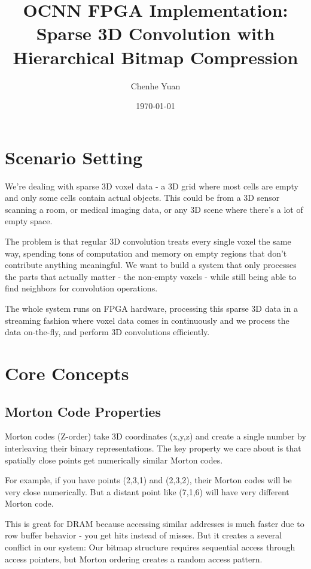 \documentclass[12pt]{article}
\title{OCNN FPGA Implementation: Sparse 3D Convolution with Hierarchical Bitmap Compression}
\author{Chenhe Yuan}
\date{\today}
\begin{document}
\maketitle

\section{Scenario Setting}

We're dealing with sparse 3D voxel data - a 3D grid where most cells are empty and only some cells contain actual objects. This could be from a 3D sensor scanning a room, or medical imaging data, or any 3D scene where there's a lot of empty space.

The problem is that regular 3D convolution treats every single voxel the same way, spending tons of computation and memory on empty regions that don't contribute anything meaningful. We want to build a system that only processes the parts that actually matter - the non-empty voxels - while still being able to find neighbors for convolution operations.

The whole system runs on FPGA hardware, processing this sparse 3D data in a streaming fashion where voxel data comes in continuously and we process the data on-the-fly, and perform 3D convolutions efficiently.

\section{Core Concepts}

\subsection{Morton Code Properties}
Morton codes (Z-order) take 3D coordinates (x,y,z) and create a single number by interleaving their binary representations. The key property we care about is that spatially close points get numerically similar Morton codes.

For example, if you have points (2,3,1) and (2,3,2), their Morton codes will be very close numerically. But a distant point like (7,1,6) will have very different Morton code.

This is great for DRAM because accessing similar addresses is much faster due to row buffer behavior - you get hits instead of misses. But it creates a several conflict in our system: Our bitmap structure requires sequential access through access pointers, but Morton ordering creates a random access pattern.
\end{document}
